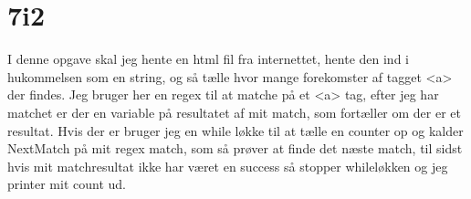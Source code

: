 \documentclass[12pt, a4paper, hidelinks]{article}
\begin{document}
\section{7i2}
I denne opgave skal jeg hente en html fil fra internettet, hente den ind i hukommelsen som en string, og så tælle hvor mange forekomster af tagget <a> der findes.
Jeg bruger her en regex til at matche på et <a> tag, efter jeg har matchet er der en variable på 
resultatet af mit match, som fortæller om der er et resultat. Hvis der er bruger jeg en while løkke til at tælle en counter op og kalder NextMatch på mit regex match, som så prøver at finde det næste match, til sidst hvis mit matchresultat ikke har været en success så stopper whileløkken og jeg printer mit count ud.
\end{document}
